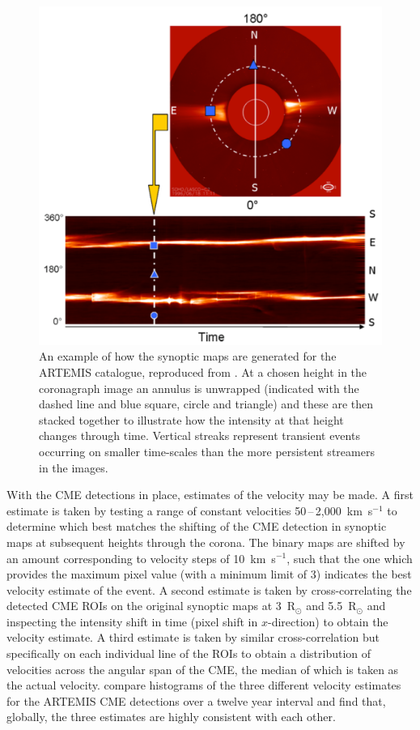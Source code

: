 \documentclass[namedreferences]{SolarPhysics}
\begin{document}
\begin{article}
\begin{figure}[!ht]
\centerline{\includegraphics[scale=0.43, clip=true, trim=0 0 0 0]{images/ARTEMIS.pdf}}
\caption{An example of how the synoptic maps are generated for the ARTEMIS catalogue, reproduced from \citet{2009SoPh..257..125B}. At a chosen height in the coronagraph image an annulus is unwrapped (indicated with the dashed line and blue square, circle and triangle) and these are then stacked together to illustrate how the intensity at that height changes through time. Vertical streaks represent transient events occurring on smaller time-scales than the more persistent streamers in the images.}
\label{artemis}
\end{figure}

With the CME detections in place, estimates of the velocity may be made. A first estimate is taken by testing a range of constant velocities 50\,--\,2,000~km~s$^{-1}$ to determine which best matches the shifting of the CME detection in synoptic maps at subsequent heights through the corona. The binary maps are shifted by an amount corresponding to velocity steps of 10~km~s$^{-1}$, such that the one which provides the maximum pixel value (with a minimum limit of 3) indicates the best velocity estimate of the event. A second estimate is taken by cross-correlating the detected CME ROIs on the original synoptic maps at 3~R$_{\odot}$ and 5.5~R$_{\odot}$ and inspecting the intensity shift in time (pixel shift in $x$-direction) to obtain the velocity estimate. A third estimate is taken by similar cross-correlation but specifically on each individual line of the ROIs to obtain a distribution of velocities across the angular span of the CME, the median of which is taken as the actual velocity. \citet{2009SoPh..257..125B} compare histograms of the three different velocity estimates for the ARTEMIS CME detections over a twelve year interval and find that, globally, the three estimates are highly consistent with each other.


\end{article}
\end{document}

